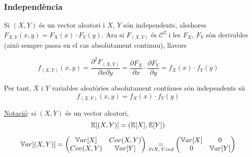 \subsubsection{Independència}

Si $(X,Y)$ és un vector aleatori i $X$, $Y$ són independents, aleshores $F_{X,Y}(x,y) = F_{X}(x)\cdot F_{Y}(y)$. Ara si $F_{(X,Y)}$ és $\mathcal{C}^{2}$ i les $F_{X}$, $F_{Y}$ són derivables (això sempre passa en el cas absolutament continuu), llavors

\[
  f_{(X,Y)}(x,y) = \frac{\partial^{2}F_{(X,Y)}}{\partial x \partial y} = \frac{\partial F_{X}}{\partial x}\cdot \frac{\partial F_{Y}}{\partial y} = f_{X}(x) \cdot f_{Y}(y)
\]

Per tant, $X$ i $Y$ variables aleatòries absolutament contínues són independents sii
\[
  f_{(X,Y)}(x,y) = f_{X}(x)\cdot f_{Y}(y)
\]

\underline{Notació}: si $(X,Y)$ és un vector aleatori, 
\[
  \mathbb{E}[(X,Y)] = (\mathbb{E}[X], \mathbb{E}[Y])
\]

\[
  \mathbb{V} ar[(X,Y)] = 
  \begin{pmatrix}
    \mathbb{V} ar[X]  &  Cov(X,Y) \\
    Cov(X,Y)  &  \mathbb{V} ar[Y]
  \end{pmatrix}
  \underset{Si X,\, Y ind}{=}
  \begin{pmatrix}
    \mathbb{V} ar[X]  &  0 \\
    0         &  \mathbb{V} ar[Y]
  \end{pmatrix}
\]
